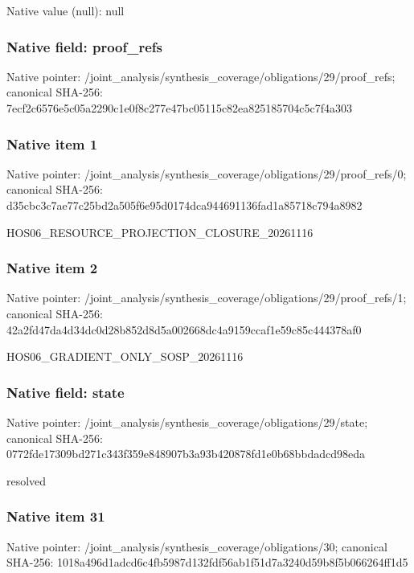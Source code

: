 \documentclass[10pt,a4paper]{article}
\begin{document}
Native value (null): null

\subsubsection{Native field: proof\_\allowbreak{}refs}
Native pointer: /joint\_\allowbreak{}analysis/synthesis\_\allowbreak{}coverage/obligations/29/proof\_\allowbreak{}refs; canonical SHA-256: 7ecf2c6576e5c05a2290c1e0f8c277e47bc05115c82ea825185704c5c7f4a303

\subsubsection{Native item 1}
Native pointer: /joint\_\allowbreak{}analysis/synthesis\_\allowbreak{}coverage/obligations/29/proof\_\allowbreak{}refs/0; canonical SHA-256: d35cbc3c7ae77c25bd2a505f6e95d0174dca944691136fad1a85718c794a8982

\begingroup\raggedright\sloppy HOS06\_\allowbreak{}RESOURCE\_\allowbreak{}PROJECTION\_\allowbreak{}CLOSURE\_\allowbreak{}20261116\par\endgroup

\subsubsection{Native item 2}
Native pointer: /joint\_\allowbreak{}analysis/synthesis\_\allowbreak{}coverage/obligations/29/proof\_\allowbreak{}refs/1; canonical SHA-256: 42a2fd47da4d34dc0d28b852d8d5a002668dc4a9159ccaf1e59c85c444378af0

\begingroup\raggedright\sloppy HOS06\_\allowbreak{}GRADIENT\_\allowbreak{}ONLY\_\allowbreak{}SOSP\_\allowbreak{}20261116\par\endgroup

\subsubsection{Native field: state}
Native pointer: /joint\_\allowbreak{}analysis/synthesis\_\allowbreak{}coverage/obligations/29/state; canonical SHA-256: 0772fde17309bd271c343f359e848907b3a93b420878fd1e0b68bbdadcd98eda

\begingroup\raggedright\sloppy resolved\par\endgroup

\subsubsection{Native item 31}
Native pointer: /joint\_\allowbreak{}analysis/synthesis\_\allowbreak{}coverage/obligations/30; canonical SHA-256: 1018a496d1adcd6c4fb5987d132fdf56ab1f51d7a3240d59b8f5b066264ff1d5
\end{document}

